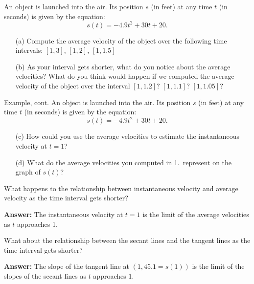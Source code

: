 \documentclass[cal1spr16Lectures.tex]{subfiles}
\begin{document}
\begin{frame}\footnotesize
\begin{ex} An object is launched into the air. Its position $s$ (in feet) at any time $t$ (in seconds) is given by the equation:
\[s(t)=-4.9t^2+30t+20.\]
\hrulefill
\begin{itemize}
\item[(a)] Compute the average velocity of the object over the following time intervals:  $[1,3],\,[1,2],\,[1,1.5]$
\item[(b)] As your interval gets shorter, what do you notice about the average velocities?  What do you think would happen if we computed the average velocity of the object over the interval $[1,1.2]$? $[1,1.1]$? $[1,1.05]$?
\end{itemize}
\end{ex}
\end{frame}

\begin{frame}\footnotesize
\begin{block}{Example, cont.} An object is launched into the air. Its position $s$ (in feet) at any time $t$ (in seconds) is given by the equation:
\[s(t)=-4.9t^2+30t+20.\]
\hrulefill
\begin{itemize}
\item[(c)] How could you use the average velocities to estimate the instantaneous velocity at $t=1$?
\item[(d)] What do the average velocities you computed in 1.\ represent on the graph of $s(t)$?
\end{itemize}
\end{block}
\end{frame}

\begin{frame}
\begin{que} What happens to the relationship between \alert{instantaneous} velocity and \alert{average} velocity as the time interval gets shorter? \end{que}

{\bf Answer:} The instantaneous velocity at $t=1$ is the limit of the average velocities as $t$ approaches 1.
\end{frame}

\begin{frame}
\begin{que} What about the relationship between the \alert{secant} lines and the \alert{tangent} lines as the time interval gets shorter? \end{que}

{\bf Answer:} The slope of the tangent line at $(1, 45.1=s(1))$ is the limit of the slopes of the secant lines as $t$ approaches 1.
\end{frame}
\end{document}
